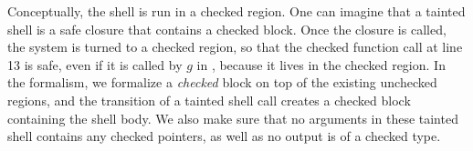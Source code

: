 Conceptually, the shell is run in a checked region.
One can imagine that a tainted shell is a safe closure that contains a checked block.
Once the closure is called, the system is turned to a checked region,
so that the checked function call at  line 13 is safe, 
even if it is called by $g$ in  , because it lives in the checked region.
In the \systemname formalism, we formalize a \textit{checked} block on top of the existing unchecked regions,
and the transition of a tainted shell call creates a checked block containing the shell body.
We also make sure that no arguments in these tainted shell contains any checked pointers,
as well as no output is of a checked type.

  





